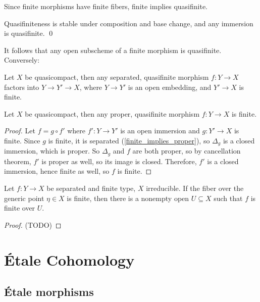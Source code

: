 \documentclass[11pt]{amsart}
\begin{document}
Since finite morphisms have finite fibers, finite implies quasifinite.

\begin{prop}
    Quasifiniteness is stable under composition and base change, and any immersion is quasifinite. \qed
\end{prop}

It follows that any open subscheme of a finite morphism is quasifinite. Conversely:



\begin{thm}
    Let $X$ be quasicompact, then any separated, quasifinite morphism $f:Y\to X$ factors into $Y\to Y'\to X$, where $Y\to Y'$ is an open embedding, and $Y'\to X$ is finite.
\end{thm}


\begin{cor}
    Let $X$ be quasicompact, then any proper, quasifinite morphism $f:Y\to X$ is finite.
\end{cor}

\begin{proof}
    Let $f = g\circ f'$ where $f':Y\to Y'$ is an open immersion and $g:Y'\to X$ is finite. Since $g$ is finite, it is separated (\ref{finite_implies_proper}), so $\Delta_g$ is a closed immersion, which is proper. So $\Delta_g$ and $f$ are both proper, so by cancellation theorem, $f'$ is proper as well, so its image is closed. Therefore, $f'$ is a closed immersion, hence finite as well, so $f$ is finite.
\end{proof}



\begin{exr}
    Let $f:Y\to X$ be separated and finite type, $X$ irreducible. If the fiber over the generic point $\eta\in X$ is finite, then there is a nonempty open $U\subseteq X$ such that $f$ is finite over $U$.
\end{exr}

\begin{proof}
    (TODO)
\end{proof}

\newpage


\section{\'Etale Cohomology}

\subsection{\'Etale morphisms}
\end{document}
